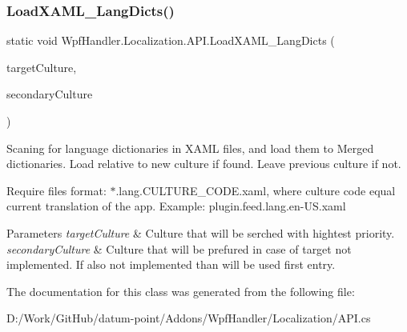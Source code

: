 \subsubsection{\texorpdfstring{Load\+X\+A\+M\+L\+\_\+\+Lang\+Dicts()}{LoadXAML\_LangDicts()}}
{\footnotesize\ttfamily static void Wpf\+Handler.\+Localization.\+A\+P\+I.\+Load\+X\+A\+M\+L\+\_\+\+Lang\+Dicts (\begin{DoxyParamCaption}\item[{Culture\+Info}]{target\+Culture,  }\item[{Culture\+Info}]{secondary\+Culture }\end{DoxyParamCaption})\hspace{0.3cm}{\ttfamily [static]}}



Scaning for language dictionaries in X\+A\+ML files, and load them to Merged dictionaries. Load relative to new culture if found. Leave previous culture if not. 

Require files format\+: $\ast$.lang.\+C\+U\+L\+T\+U\+R\+E\+\_\+\+C\+O\+D\+E.\+xaml, where culture code equal current translation of the app. Example\+: plugin.\+feed.\+lang.\+en-\/\+U\+S.\+xaml 


\begin{DoxyParams}{Parameters}
{\em target\+Culture} & Culture that will be serched with hightest priority.\\
\hline
{\em secondary\+Culture} & Culture that will be prefured in case of target not implemented. If also not implemented than will be used first entry.\\
\hline
\end{DoxyParams}


The documentation for this class was generated from the following file\+:\begin{DoxyCompactItemize}
\item 
D\+:/\+Work/\+Git\+Hub/datum-\/point/\+Addons/\+Wpf\+Handler/\+Localization/A\+P\+I.\+cs\end{DoxyCompactItemize}
